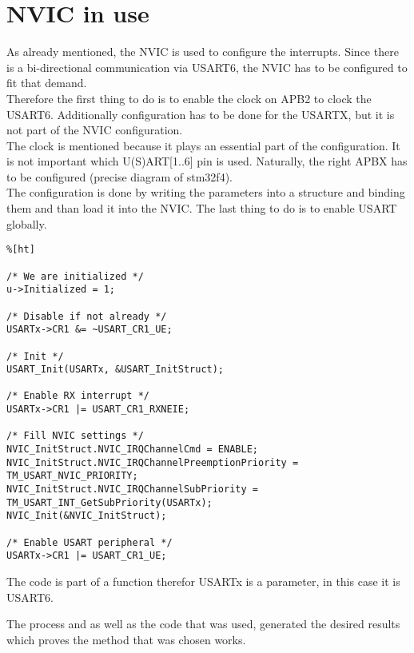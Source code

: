\chapter{NVIC in use}
As already mentioned, the NVIC is used to configure the interrupts. Since
there is a bi-directional communication via USART6, the NVIC has to be
configured to fit that demand.\\
Therefore the first thing to do is to enable the clock on APB2 to clock
the USART6. Additionally configuration has to be done for the USARTX,
 but it is not part of the NVIC configuration.\\
The clock is mentioned because it plays an essential part of the configuration. 
It is not important which U(S)ART[1..6] pin is used. Naturally, the right APBX 
has to be configured (precise diagram of stm32f4).\\
The configuration is done by writing the parameters into a structure and
binding them and than load it into the NVIC.
The last thing to do is to enable USART globally.

\begin{lstlisting}%[ht]

/* We are initialized */
u->Initialized = 1;

/* Disable if not already */
USARTx->CR1 &= ~USART_CR1_UE;

/* Init */
USART_Init(USARTx, &USART_InitStruct);

/* Enable RX interrupt */
USARTx->CR1 |= USART_CR1_RXNEIE;

/* Fill NVIC settings */
NVIC_InitStruct.NVIC_IRQChannelCmd = ENABLE;
NVIC_InitStruct.NVIC_IRQChannelPreemptionPriority = TM_USART_NVIC_PRIORITY;
NVIC_InitStruct.NVIC_IRQChannelSubPriority = TM_USART_INT_GetSubPriority(USARTx);
NVIC_Init(&NVIC_InitStruct);

/* Enable USART peripheral */
USARTx->CR1 |= USART_CR1_UE;
\end{lstlisting}

The code is part of a function therefor USARTx is a parameter, in this case it
is USART6.

The process and as well as the code that was used, generated the desired results
 which proves the method that was chosen works.



